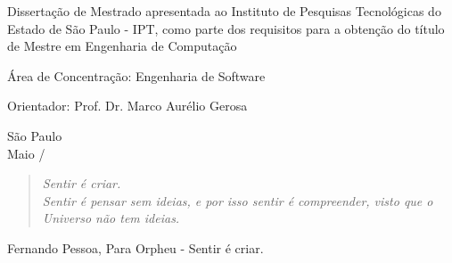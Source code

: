 \documentclass[12pt,twoside,a4paper]{book} %
\begin{document}
    \vskip 2cm

    \hspace{6cm}\begin{minipage}{0.48\linewidth}
	Dissertação de Mestrado apresentada
	ao Instituto de Pesquisas Tecnológicas do\\
	Estado de São Paulo - IPT, como 
	parte dos requisitos para a obtenção do 
	título de Mestre em Engenharia de 
	Computação
    \end{minipage}
    
    \vskip 2cm
    
    \hspace{6cm}\begin{minipage}{0.48\linewidth}
	Área de Concentração: Engenharia de Software
    \end{minipage}
    
    \vskip 2cm
    
    \hspace{6cm}\begin{minipage}{0.48\linewidth}
	Orientador: Prof. Dr. Marco Aurélio Gerosa
    \end{minipage}
    
    \vskip 6cm
    
    \begin{center}
        São Paulo\\
        
        Maio / \the\year
    \end{center}

\pagebreak

\newpage
\thispagestyle{empty}

\begin{center}
        \vspace*{6 cm}
        \begin{quote}
            \textit{Sentir é criar.\\
            Sentir é pensar sem ideias, e por isso sentir é compreender, visto que o Universo não tem ideias.}
        \end{quote}
        \begin{flushright}
        Fernando Pessoa, Para Orpheu - Sentir é criar.\\
        \end{flushright}
    \end{center}


\pagebreak


\end{document}
